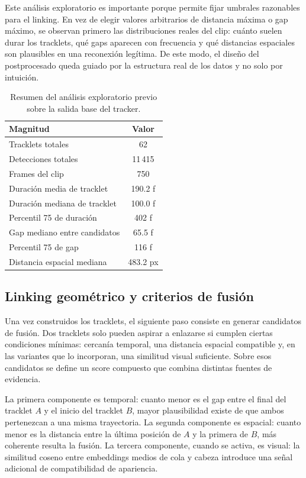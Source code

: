 \documentclass[../MAIN.tex]{subfiles}
\begin{document}
	Este análisis exploratorio es importante porque permite fijar umbrales razonables para el linking. En vez de elegir valores arbitrarios de distancia máxima o gap máximo, se observan primero las distribuciones reales del clip: cuánto suelen durar los tracklets, qué gaps aparecen con frecuencia y qué distancias espaciales son plausibles en una reconexión legítima. De este modo, el diseño del postprocesado queda guiado por la estructura real de los datos y no solo por intuición.
	
	\begin{table}[H]
		\centering
		\caption{Resumen del análisis exploratorio previo sobre la salida base del tracker.}
		\label{tab:cap10_exploratorio}
		\begin{tabular}{lc}
			\toprule
			\textbf{Magnitud} & \textbf{Valor} \\
			\midrule
			Tracklets totales & 62 \\
			Detecciones totales & 11\,415 \\
			Frames del clip & 750 \\
			Duración media de tracklet & 190.2 f \\
			Duración mediana de tracklet & 100.0 f \\
			Percentil 75 de duración & 402 f \\
			Gap mediano entre candidatos & 65.5 f \\
			Percentil 75 de gap & 116 f \\
			Distancia espacial mediana & 483.2 px \\
			\bottomrule
		\end{tabular}
	\end{table}
	
	\subsection{Linking geométrico y criterios de fusión}
	
	Una vez construidos los tracklets, el siguiente paso consiste en generar candidatos de fusión. Dos tracklets solo pueden aspirar a enlazarse si cumplen ciertas condiciones mínimas: cercanía temporal, una distancia espacial compatible y, en las variantes que lo incorporan, una similitud visual suficiente. Sobre esos candidatos se define un score compuesto que combina distintas fuentes de evidencia.
	
	La primera componente es temporal: cuanto menor es el gap entre el final del tracklet \(A\) y el inicio del tracklet \(B\), mayor plausibilidad existe de que ambos pertenezcan a una misma trayectoria. La segunda componente es espacial: cuanto menor es la distancia entre la última posición de \(A\) y la primera de \(B\), más coherente resulta la fusión. La tercera componente, cuando se activa, es visual: la similitud coseno entre embeddings medios de cola y cabeza introduce una señal adicional de compatibilidad de apariencia.
	
\end{document}
